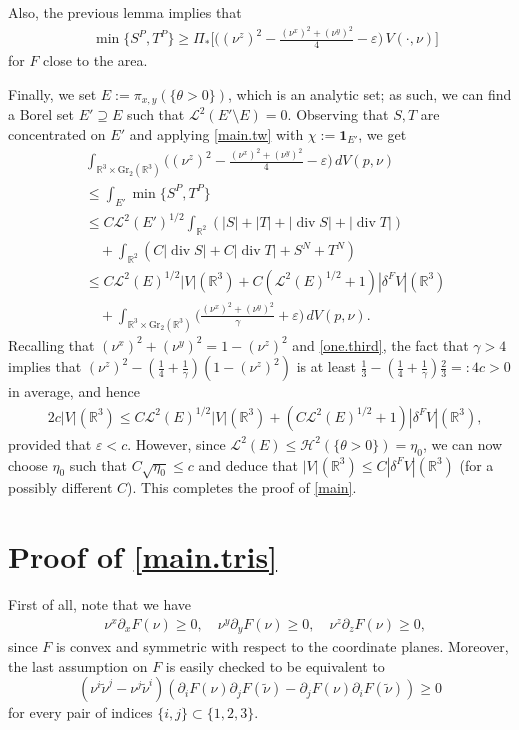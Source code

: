 \documentclass[11pt,a4paper]{amsart}
\newcommand{\R}{\mathbb{R}}
\newcommand{\de}{\partial}
\newcommand{\uno}{\bm{1}}
\theoremstyle{definition}
\DeclareMathOperator{\dive}{div}
\newcommand{\hau}{\mathcal{H}}
\renewcommand{\epsilon}{\varepsilon}
\begin{document}
Also, the previous lemma implies that
\begin{align*}
	&\min\{S^P,T^P\}
	\ge\Pi_*\Big[\Big((\nu^z)^2-\frac{(\nu^x)^2+(\nu^y)^2}{4}-\epsilon\Big)\,V(\cdot,\nu)\Big]
\end{align*}
for $F$ close to the area.

Finally, we set $E:=\pi_{x,y}(\{\theta>0\})$, which is an analytic set;
as such, we can find a Borel set $E'\supseteq E$ such that $\mathcal{L}^2(E'\setminus E)=0$.
Observing that $S,T$ are concentrated on $E'$ and applying \cref{main.tw} with $\chi:=\uno_{E'}$, we get
\begin{align*}
	&\int_{\R^3\times\text{Gr}_2(\R^3)}\Big((\nu^z)^2-\frac{(\nu^x)^2+(\nu^y)^2}{4}-\epsilon\Big)\,dV(p,\nu) \\
	&\le\int_{E'}\min\{S^P,T^P\} \\
	&\le C\mathcal{L}^2(E')^{1/2}\int_{\R^2}(|S|+|T|+\lvert \dive S\rvert+\lvert \dive T\rvert) \\
	&\quad+\int_{\R^2}(C\lvert \dive S\rvert+C\lvert \dive T\rvert+S^N+T^N) \\
	&\le C\mathcal{L}^2(E)^{1/2}|V|(\R^3)+C(\mathcal{L}^2(E)^{1/2}+1)|\delta^F V|(\R^3) \\
	&\quad+\int_{\R^3\times\text{Gr}_2(\R^3)}\Big(\frac{(\nu^x)^2+(\nu^y)^2}{\gamma}+\epsilon\Big)\,dV(p,\nu).
\end{align*}
Recalling that $(\nu^x)^2+(\nu^y)^2=1-(\nu^z)^2$ and \cref{one.third}, the fact that $\gamma>4$ implies
that $(\nu^z)^2-(\frac14+\frac1\gamma)(1-(\nu^z)^2)$ is at least
$\frac13-(\frac14+\frac1\gamma)\frac23=:4c>0$ in average, and hence
\begin{align*}
	&2c|V|(\R^3)
	\le C\mathcal{L}^2(E)^{1/2}|V|(\R^3)+(C\mathcal{L}^2(E)^{1/2}+1)|\delta^F V|(\R^3),
\end{align*}
provided that $\epsilon<c$. However, since $\mathcal{L}^2(E)\le\hau^2(\{\theta>0\})=\eta_0$,
we can now choose $\eta_0$ such that $C\sqrt{\eta_0}\le c$ and deduce that $|V|(\R^3)\le C|\delta^F V|(\R^3)$
(for a possibly different $C$). This completes the proof of \cref{main}.

\section{Proof of \cref{main.tris}}
First of all, note that we have
\begin{align}\label{symm.planes}
    &\nu^x\de_xF(\nu)\ge0,\quad\nu^y\de_yF(\nu)\ge0,\quad\nu^z\de_zF(\nu)\ge0,
\end{align}
since $F$ is convex and symmetric with respect to the coordinate planes.
Moreover, the last assumption on $F$ is easily checked to be equivalent to
\begin{equation}\label{rot.mono}
    (\nu^i\tilde\nu^j-\nu^j\tilde\nu^i)(\de_iF(\nu)\de_jF(\tilde\nu)-\de_jF(\nu)\de_iF(\tilde\nu))\ge0
\end{equation}
for every pair of indices $\{i,j\}\subset\{1,2,3\}$.
\end{document}
